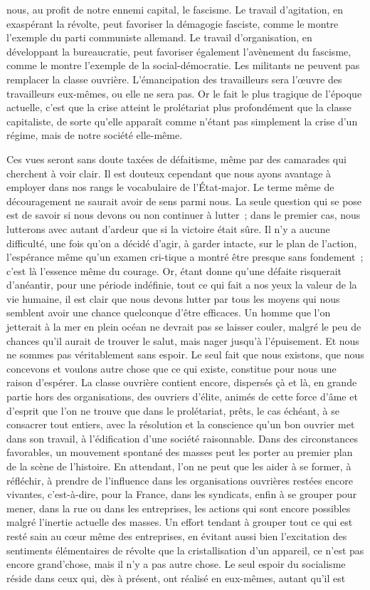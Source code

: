\documentclass[french,twoside]{book} %
\begin{document}
nous, au profit de notre ennemi capital, le fascisme. Le travail d'agitation, en exaspérant la révolte, peut favoriser la démagogie fasciste, comme le montre l'exemple du parti communiste allemand. Le travail d'organisation, en développant la bureaucratie, peut favoriser également l'avènement du fascisme, comme le montre l'exemple de la social-démocratie. Les militants ne peuvent pas remplacer la classe ouvrière. L'émancipation des travailleurs sera l'œuvre des travailleurs eux-mêmes, ou elle ne sera pas. Or le fait le plus tragique de l'époque actuelle, c'est que la crise atteint le prolétariat plus profondément que la classe capitaliste, de sorte qu'elle apparaît comme n'étant pas simplement la crise d'un régime, mais de notre société elle-même.\par
Ces vues seront sans doute taxées de défaitisme, même par des camarades qui cherchent à voir clair. Il est douteux cependant que nous ayons avantage à employer dans nos rangs le vocabulaire de l'État-major. Le terme même de découragement ne saurait avoir de sens parmi nous. La seule question qui se pose est de savoir si nous devons ou non continuer à lutter ; dans le premier cas, nous lutterons avec autant d'ardeur que si la victoire était sûre. Il n'y a aucune difficulté, une fois qu'on a décidé d'agir, à garder intacte, sur le plan de l'action, l'espérance même qu'un examen cri-tique a montré être presque sans fondement ; c'est là l'essence même du courage. Or, étant donne qu'une défaite risquerait d'anéantir, pour une période indéfinie, tout ce qui fait a nos yeux la valeur de la vie humaine, il est clair que nous devons lutter par tous les moyens qui nous semblent avoir une chance quelconque d'être efficaces. Un homme que l'on jetterait à la mer en plein océan ne devrait pas se laisser couler, malgré le peu de chances qu'il aurait de trouver le salut, mais nager jusqu'à l'épuisement. Et nous ne sommes pas véritablement sans espoir. Le seul fait que nous existons, que nous concevons et voulons autre chose que ce qui existe, constitue pour nous une raison d'espérer. La classe ouvrière contient encore, dispersés çà et là, en grande partie hors des organisations, des ouvriers d'élite, animés de cette force d'âme et d'esprit que l'on ne trouve que dans le prolétariat, prêts, le cas échéant, à se consacrer tout entiers, avec la résolution et la conscience qu'un bon ouvrier met dans son travail, à l'édification d'une société raisonnable. Dans des circonstances favorables, un mouvement spontané des masses peut les porter au premier plan de la scène de l'histoire. En attendant, l'on ne peut que les aider à se former, à réfléchir, à prendre de l'influence dans les organisations ouvrières restées encore vivantes, c'est-à-dire, pour la France, dans les syndicats, enfin à se grouper pour mener, dans la rue ou dans les entreprises, les actions qui sont encore possibles malgré l'inertie actuelle des masses. Un effort tendant à grouper tout ce qui est resté sain au cœur même des entreprises, en évitant aussi bien l'excitation des sentiments élémentaires de révolte que la cristallisation d'un appareil, ce n'est pas encore grand'chose, mais il n'y a pas autre chose. Le seul espoir du socialisme réside dans ceux qui, dès à présent, ont réalisé en eux-mêmes, autant qu'il est 
\end{document}

